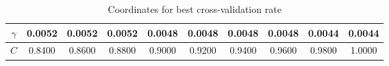 \documentclass[a4paper,11pt]{article}
\theoremstyle{definition}
\theoremstyle{plain}
\theoremstyle{remark}
\begin{document}
\begin{table}[H]
\centering
\begin{tabular}{|c|c|c|c|c|c|c|c|c|c|}
\hline
$\gamma$ & 0.0052  &  0.0052  &  0.0052  &  0.0048  &  0.0048  &  0.0048  &  0.0048  &  0.0044  &  0.0044 \\\hline
$C$      & 0.8400  &  0.8600  &  0.8800  &  0.9000  &  0.9200  &  0.9400  &  0.9600  &  0.9800  &  1.0000 \\\hline
\end{tabular}
\caption{Coordinates for best cross-validation rate}
\label{tab:cv}
\end{table}
\end{document}
